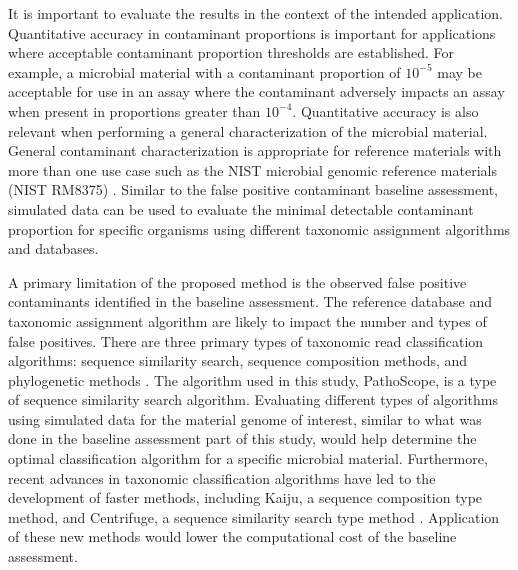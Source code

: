 \documentclass[fleqn,10pt,lineno]{wlpeerj}\usepackage[]{graphicx}\usepackage[]{color}
\begin{document}
It is important to evaluate the results in the context of the intended application.
Quantitative accuracy in contaminant proportions is important for applications where acceptable contaminant proportion thresholds are established.
For example, a microbial material with a contaminant proportion of $10^{-5}$ may be acceptable for use in an assay where the contaminant adversely impacts an assay when present in proportions greater than $10^{-4}$.
Quantitative accuracy is also relevant when performing a general characterization of the microbial material.
General contaminant characterization is appropriate for reference materials with more than one use case such as the NIST microbial genomic reference materials (NIST RM8375) \citep{olson2016pepr}.
Similar to the false positive contaminant baseline assessment,
simulated data can be used to evaluate the minimal detectable contaminant proportion for specific organisms using different taxonomic assignment algorithms and databases.

A primary limitation of the proposed method is the observed false positive contaminants identified in the baseline assessment. 
The reference database and taxonomic assignment algorithm are likely to impact the number and types of false positives. 
There are three primary types of taxonomic read classification algorithms: sequence similarity search, sequence composition methods, and phylogenetic methods \citep{Bazinet2012}. 
The algorithm used in this study, PathoScope, is a type of sequence similarity search algorithm. 
Evaluating different types of algorithms using simulated data for the material genome of interest, similar to what was done in the baseline assessment part of this study, would help determine the optimal classification algorithm for a specific microbial material. 
Furthermore, recent advances in taxonomic classification algorithms have led to the development of faster methods, including Kaiju, a sequence composition type method, and Centrifuge, a sequence similarity search type method \citep{menzel2016fast,Kim2016-ir}. 
Application of these new methods would lower the computational cost of the baseline assessment. 
\end{document}
